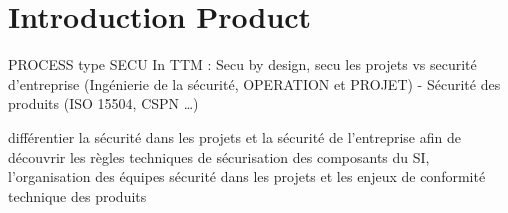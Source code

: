 
\section{Introduction Product}
PROCESS type SECU In TTM : Secu by design, secu les projets vs securité d'entreprise (Ingénierie de la sécurité, OPERATION et PROJET) - Sécurité des produits (ISO 15504, CSPN …)

différentier la sécurité dans les projets et la sécurité de l'entreprise afin de découvrir les règles techniques de sécurisation des composants du SI, l'organisation des équipes sécurité dans les projets et les enjeux de conformité technique des produits

